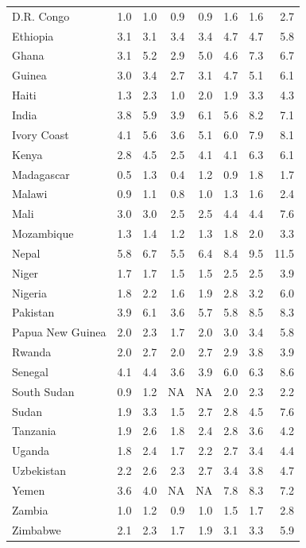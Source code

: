 \documentclass[12pt,english]{article}
\begin{document}
\begin{table}[b]
{\begin{tabular}[t]{lrrrrrrr}
              D.R. Congo & 1.0 & 1.0 & 0.9 & 0.9 & 1.6 & 1.6 & 2.7\\
              Ethiopia & 3.1 & 3.1 & 3.4 & 3.4 & 4.7 & 4.7 & 5.8\\
              Ghana & 3.1 & 5.2 & 2.9 & 5.0 & 4.6 & 7.3 & 6.7\\
              Guinea & 3.0 & 3.4 & 2.7 & 3.1 & 4.7 & 5.1 & 6.1\\
              Haiti & 1.3 & 2.3 & 1.0 & 2.0 & 1.9 & 3.3 & 4.3\\
              India & 3.8 & 5.9 & 3.9 & 6.1 & 5.6 & 8.2 & 7.1\\
              Ivory Coast & 4.1 & 5.6 & 3.6 & 5.1 & 6.0 & 7.9 & 8.1\\
              Kenya & 2.8 & 4.5 & 2.5 & 4.1 & 4.1 & 6.3 & 6.1\\
              Madagascar & 0.5 & 1.3 & 0.4 & 1.2 & 0.9 & 1.8 & 1.7\\
              Malawi & 0.9 & 1.1 & 0.8 & 1.0 & 1.3 & 1.6 & 2.4\\
              Mali & 3.0 & 3.0 & 2.5 & 2.5 & 4.4 & 4.4 & 7.6\\
              Mozambique & 1.3 & 1.4 & 1.2 & 1.3 & 1.8 & 2.0 & 3.3\\
              Nepal & 5.8 & 6.7 & 5.5 & 6.4 & 8.4 & 9.5 & 11.5\\
              Niger & 1.7 & 1.7 & 1.5 & 1.5 & 2.5 & 2.5 & 3.9\\
              Nigeria & 1.8 & 2.2 & 1.6 & 1.9 & 2.8 & 3.2 & 6.0\\
              Pakistan & 3.9 & 6.1 & 3.6 & 5.7 & 5.8 & 8.5 & 8.3\\
              Papua New Guinea & 2.0 & 2.3 & 1.7 & 2.0 & 3.0 & 3.4 & 5.8\\
              Rwanda & 2.0 & 2.7 & 2.0 & 2.7 & 2.9 & 3.8 & 3.9\\
              Senegal & 4.1 & 4.4 & 3.6 & 3.9 & 6.0 & 6.3 & 8.6\\
              South Sudan & 0.9 & 1.2 & NA & NA & 2.0 & 2.3 & 2.2\\
              Sudan & 1.9 & 3.3 & 1.5 & 2.7 & 2.8 & 4.5 & 7.6\\
              Tanzania & 1.9 & 2.6 & 1.8 & 2.4 & 2.8 & 3.6 & 4.2\\
              Uganda & 1.8 & 2.4 & 1.7 & 2.2 & 2.7 & 3.4 & 4.4\\
              Uzbekistan & 2.2 & 2.6 & 2.3 & 2.7 & 3.4 & 3.8 & 4.7\\
              Yemen & 3.6 & 4.0 & NA & NA & 7.8 & 8.3 & 7.2\\
              Zambia & 1.0 & 1.2 & 0.9 & 1.0 & 1.5 & 1.7 & 2.8\\
              Zimbabwe & 2.1 & 2.3 & 1.7 & 1.9 & 3.1 & 3.3 & 5.9\\
              \bottomrule
              \end{tabular}}
              \end{table}
\end{document}
